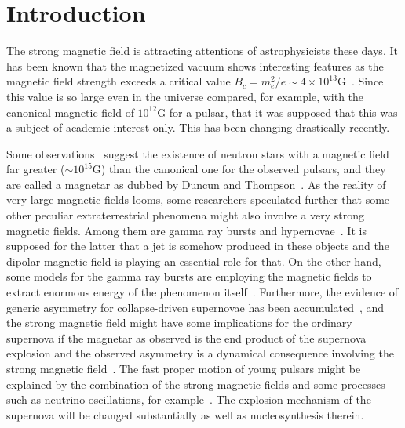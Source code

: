 

\section{Introduction}
\label{sec:Intro}

The strong magnetic field is attracting attentions of astrophysicists
these days. It has been known that the magnetized vacuum shows 
interesting features as the magnetic field strength exceeds a critical 
value $B_{c} = m_{e}^{2}/e \sim 4\times 10^{13}$G~\cite{du,lai}. Since 
this value is so large even in the universe compared, for example, with
the canonical magnetic field of $10^{12}$G for a pulsar, that it was
supposed that this was a subject of academic interest only. This has 
been changing drastically recently.

Some observations~\cite{ko} suggest the existence of neutron stars with 
a magnetic field far greater ($\sim 10^{15}$G) than the canonical one 
for the observed pulsars, and they are called a magnetar as dubbed by 
Duncun and Thompson~\cite{dt}. As the reality of very large magnetic 
fields looms, some researchers speculated further that some other 
peculiar extraterrestrial phenomena might also involve a very strong
magnetic fields. Among them are gamma ray bursts and
hypernovae~\cite{pa}. It is supposed for the latter that a jet is 
somehow produced in these objects and the dipolar magnetic
field is playing an essential role for that. On the other hand, some 
models for the gamma ray bursts are employing the magnetic fields to 
extract enormous energy of the phenomenon itself~\cite{bz}. 
Furthermore, the evidence of generic asymmetry for collapse-driven 
supernovae has been accumulated~\cite{wh}, and the strong magnetic 
field might have some implications for the ordinary supernova if the 
magnetar as observed is the end product of the supernova explosion 
and the observed asymmetry is a dynamical consequence involving the 
strong magnetic field~\cite{sy}. The fast proper motion of young
pulsars might be explained by the combination of the strong magnetic 
fields and some processes such as neutrino oscillations, 
for example~\cite{ks}. The explosion mechanism of the supernova will 
be changed substantially as well as nucleosynthesis therein.

